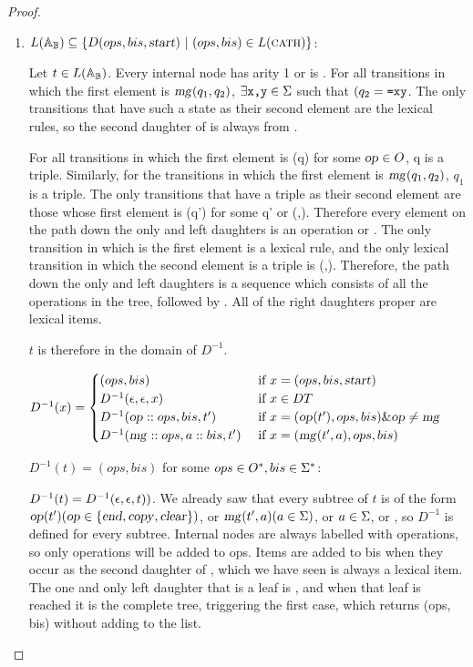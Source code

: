 \documentclass[12pt]{article}
\theoremstyle{definition}
\begin{document}
\begin{proof}
  \begin{enumerate}
  \item
    $L(\mathbb{A}_\mathbb{B})\subseteq\{D(ops,bis,\text{\textsl{start}}) ~|~ (ops,bis)\in L(\text{\textsc{cath}})\}$: 

    Let $t\in L(\mathbb{A}_\mathbb{B})$. Every internal node has arity 1 or is \mg. For all transitions in which the first element is $\text{\textsl{mg}}(q_1,q_2)$, $\exists \text{\texttt{x,y}}\in\Sigma$ such that  $(q_2=\text{\texttt{=xy}}$. The only transitions that have such a state as their second element are the lexical rules, so the second daughter of \mg is always from \sg.

    For all transitions in which the first element is \op(q) for some $\text{\textsl{op}}\in O$, q is a triple. Similarly, for the transitions in which the first element is $\text{\textsl{mg}}(q_1,q_2)$, $q_1$ is a triple. The only transitions that have a triple as their second element are those whose first element is \op(q') for some q' or (\start,). Therefore every element on the path down the only and left daughters is an operation or \start. The only transition in which \start is the first element is a lexical rule, and the only lexical transition in which the second element is a triple is (\start,). Therefore, the path down the only and left daughters is a sequence which consists of all the operations in the tree, followed by \start.
    All of the right daughters proper are lexical items.

    $t$ is therefore in the domain of $D^{-1}$. 

    $D^{-1}(x) =
    \begin{cases}
      (ops,bis) & \text{ if } x=(ops,bis,\text{\textsl{start}})\\
      D^{-1}(\epsilon,\epsilon,x) & \text{ if } x\in DT\\
      D^{-1}(\text{\textsl{op}}::ops,bis,t') & \text{ if } x = (\text{\textsl{op}}(t'),ops,bis) \& \text{\textsl{op}}\neq\text{\textsl{mg}}\\
      D^{-1}(\text{\textsl{mg}}::ops,a::bis,t') & \text{ if } x = (\text{\textsl{mg}}(t',a),ops,bis)\\
    \end{cases}
    $
    
    $D^{-1}(t) = (ops,bis)$ for some $ops\in O^*, bis\in\Sigma^*$:

    $D^{-1}(t) = D^{-1}(\epsilon,\epsilon,t))$. We already saw that every subtree of $t$ is of the form $\text{\textsl{op}}(t') (\text{\textsl{op}}\in\{\text{\textsl{end}},\text{\textsl{copy}},\text{\textsl{clear}}\})$, or $\text{\textsl{mg}}(t',a) (a\in\Sigma)$, or $a\in\Sigma$, or \start, so  $D^{-1}$ is defined for every subtree. Internal nodes are always labelled with operations, so only operations will be added to ops. Items are added to bis when they occur as the second daughter of \mg, which we have seen is always a lexical item. The one and only left daughter that is a leaf is \start, and when that leaf is reached it is the complete tree, triggering the first case, which returns (ops, bis) without adding \start to the list.


\end{enumerate}
\end{proof}
\end{document}
